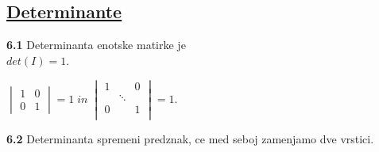 \documentclass{article}
\begin{document}
\begin{multicols}{3}
\section{\underline{Determinante}}

\textbf{6.1} Determinanta enotske matirke je\\ $det(I) = 1$.
\begin{center}
    \begin{math}
        \begin{vmatrix}
            1 & 0\\
            0 & 1
        \end{vmatrix}
        = 1\; in\;
        \begin{vmatrix}
            1 & & 0\\
            & \ddots &\\
            0 & & 1\\
        \end{vmatrix}
        = 1.
    \end{math}
\end{center}

\textbf{6.2} Determinanta spremeni predznak, ce med seboj zamenjamo dve vrstici.


\end{multicols}
\end{document}
